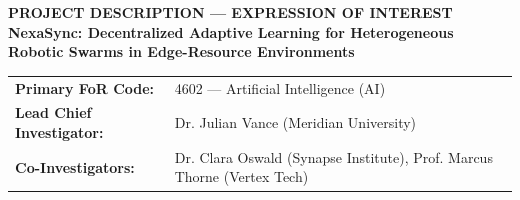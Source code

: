 \documentclass[12pt,a4paper]{article}
\begin{document}
\begin{tcolorbox}[
    colback=lightgrey,
    colframe=arcnavy,
    leftrule=4pt, rightrule=0pt, toprule=0pt, bottomrule=0pt,
    arc=0mm,
    boxrule=0pt,
    boxsep=10pt,
    left=15pt, right=15pt, top=10pt, bottom=10pt
]
    {\sffamily\color{arcnavy}\bfseries\large PROJECT DESCRIPTION --- EXPRESSION OF INTEREST}\\[0.5em]
    {\sffamily\color{darkcharcoal}\Large\bfseries NexaSync: Decentralized Adaptive Learning for Heterogeneous Robotic Swarms in Edge-Resource Environments}\\[0.8em]
    \noindent\begin{tabularx}{\linewidth}{@{}l X}
        \textbf{Primary FoR Code:} & 4602 --- Artificial Intelligence (AI) \\
        \textbf{Lead Chief Investigator:} & Dr. Julian Vance (Meridian University) \\
        \textbf{Co-Investigators:} & Dr. Clara Oswald (Synapse Institute), Prof. Marcus Thorne (Vertex Tech) \\
    \end{tabularx}
\end{tcolorbox}

\vspace{1em}





\end{document}
